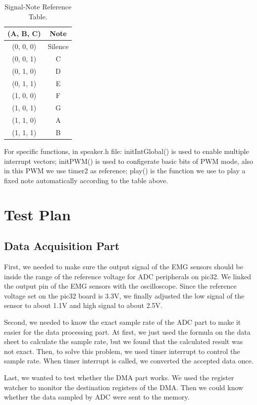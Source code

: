 \documentclass[12pt]{article}
\begin{document}
\begin{table}[H]
\centering
\begin{tabular}{cc}
(A, B, C) & Note \\\hline
(0, 0, 0) & Silence \\
(0, 0, 1) & C \\
(0, 1, 0) & D \\
(0, 1, 1) & E \\
(1, 0, 0) & F \\
(1, 0, 1) & G \\
(1, 1, 0) & A \\
(1, 1, 1) & B \\
\end{tabular}
\caption{Signal-Note Reference Table.}
\end{table} 

For specific functions, in speaker.h file: initIntGlobal() is used to enable multiple interrupt vectors; initPWM() is used to configerate basic bits of PWM mode, also in this PWM we use timer2 as reference; play() is the function we use to play a fixed note automatically according to the table above. 


\newpage
\section{Test Plan}
\subsection{Data Acquisition Part}

First, we needed to make sure the output signal of the EMG sensors should be inside the range of the reference voltage for ADC peripherals on pic32. We linked the output pin of the EMG sensors with the oscilloscope. Since the reference voltage set on the pic32 board is 3.3V, we finally adjusted the low signal of the sensor to about 1.1V and high signal to about 2.5V.

Second, we needed to know the exact sample rate of the ADC part to make it easier for the data processing part. At first, we just used the formula on the data sheet to calculate the sample rate, but we found that the calculated result was not exact. Then, to solve this problem, we used timer interrupt to control the sample rate. When timer interrupt is called, we converted the accepted data once.

Last, we wanted to test whether the DMA part works. We used the register watcher to monitor the destination registers of the DMA. Then we could know whether the data sampled by ADC were sent to the memory.
\end{document}
